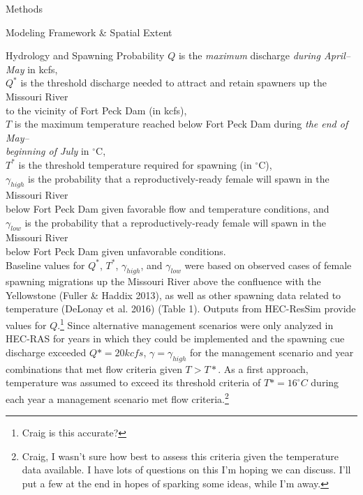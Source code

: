 \documentclass[12pt]{article}
\begin{document}
\begin{section}{Methods}
\begin{subsection}{Modeling Framework \& Spatial Extent}
\begin{subsubsection}{Hydrology and Spawning Probability}
\hspace*{0.5cm}$Q$ is the \textit{maximum} discharge \textit{during April--May} in kcfs,\\
\hspace*{0.5cm}$Q^{*}$ is the threshold discharge needed to attract and retain spawners up the Missouri River\\ 
\hspace*{1.5cm}to the vicinity of Fort Peck Dam (in kcfs),\\
\hspace*{0.5cm}$T$ is the maximum temperature reached below Fort Peck Dam during \textit{the end of May--\\
\hspace*{1.5cm}beginning of July} in $^{\circ}$C,\\
\hspace*{0.5cm}$T^{*}$ is the threshold temperature required for spawning (in $^{\circ}$C),\\
\hspace*{0.5cm}$\gamma_{high}$ is the probability that a reproductively-ready female will spawn in the Missouri River\\ 
\hspace*{1.5cm}below Fort Peck Dam given favorable flow and temperature conditions, and\\
\hspace*{0.5cm}$\gamma_{low}$ is the probability that a reproductively-ready female will spawn in the Missouri River\\
\hspace*{1.5cm}below Fort Peck Dam given unfavorable conditions.\\

Baseline values for $Q^{*}$, $T^{*}$, $\gamma_{high}$, and $\gamma_{low}$ were based on observed cases of female spawning migrations up the Missouri River above the confluence with the Yellowstone (Fuller \& Haddix 2013), as well as other spawning data related to temperature (DeLonay et al. 2016) (Table 1).  Outputs from HEC-ResSim provide values for $Q$.\footnote{Craig is this accurate?}  Since alternative management scenarios were only analyzed in HEC-RAS for years in which they could be implemented and the spawning cue discharge exceeded $Q*=20kcfs$, $\gamma=\gamma_{high}$ for the management scenario and year combinations that met flow criteria given $T>T*$.  As a first approach, temperature was assumed to exceed its threshold criteria of $T*=16^{\circ}C$ during each year a management scenario met flow criteria.\footnote{Craig, I wasn't sure how best to assess this criteria given the temperature data available.  I have lots of questions on this I'm hoping we can discuss.  I'll put a few at the end in hopes of sparking some ideas, while I'm away.}   
\end{subsubsection} 


\end{subsection}
\end{section}
\end{document}

